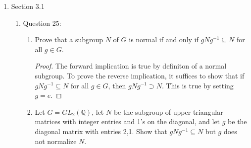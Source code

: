 \documentclass{article}
\begin{document}
\begin{enumerate}
\begin{enumerate}
\begin{proof}
          Summarizing our two arguments above, to check if a subgroup of
          $D_{16}$ lies in the normalizer of $H=\langle s,r^4\rangle$, it
          suffices to check that each generator of $H$ under conjugation by
          any generator of the subgroup remains in $H$. We go through
          the generators of each subgroup of $D_{16}$ to identify the
          largest subgroup $K$ whose generators all commute with $H$. That
          subgroup $K$ would be the normalizer of $H$. \\

          Now after the multiplying out the generators of $H$ and using the
          rules $s^2=r^8=1$ and $rs=sr^{-1}$ of $D_{16}$, we find that $H$
          contains four unique elements: $H=\{1,s,r^4,sr^4\}$. We find that
          $D_{16}$'s largest non-trivial subgroup $\langle s,r^2\rangle$
          lies in the normalizer of $H$ because the generators $s$ and $r^4$
          of $H$, under conjugation by $s$ or $r^2$, remain in $H$.
          However, $D_{16}$ does not lie in the normalizer because
          element $r$ of $D_{16}$ does not commute with $H$. More
          specifically, $rsr^{-1}=sr^{-2}=sr^6$, which does not lie in $H$,
          because in $D_{16}$, elements $s^{a_1}r^{b_1}$ and
          $s^{a_2}r^{b_2}$ are equal if and only if $a_1\equiv a_2\pmod{2}$
          and $b_1\equiv b_2\pmod{8}$. Hence, the normalizer of $\langle
          s,r^4\rangle$ is $\langle s,r^2\rangle$.
        \end{proof}
    \end{enumerate}

  \item Section 3.1
    \begin{enumerate}
      \item Question 25:
        \begin{enumerate}
          \item Prove that a subgroup $N$ of $G$ is normal if and only if
            $gNg^{-1}\subseteq N$ for all $g\in G$.
            \begin{proof}
              The forward implication is true by definiton of a normal
              subgroup. To prove the reverse implication, it suffices to
              show that if $gNg^{-1}\subseteq N$ for all $g\in G$, then
              $gNg^{-1}\supset N$. This is true by setting $g=e$.
            \end{proof}

          \item Let $G=GL_2(\mathbb{Q})$, let $N$ be the subgroup of upper
            triangular matrices with integer entries and 1's on the
            diagonal, and let $g$ be the diagonal matrix with entries 2,1.
            Show that $gNg^{-1}\subseteq N$ but $g$ does not normalize $N$.


\end{enumerate}
\end{enumerate}
\end{enumerate}
\end{document}
